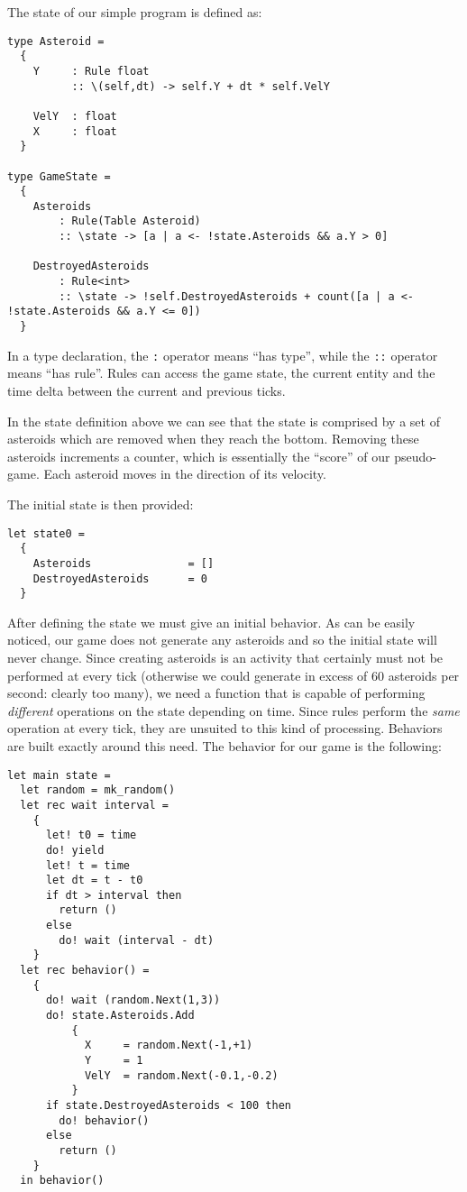 The state of our simple program is defined as:

\begin{lstlisting}
type Asteroid =
  {
    Y     : Rule float
          :: \(self,dt) -> self.Y + dt * self.VelY
        
    VelY  : float        
    X     : float
  }

type GameState =
  {
    Asteroids           
        : Rule(Table Asteroid)
        :: \state -> [a | a <- !state.Asteroids && a.Y > 0]
  	    
    DestroyedAsteroids	
        : Rule<int>
        :: \state -> !self.DestroyedAsteroids + count([a | a <- !state.Asteroids && a.Y <= 0])
  }
\end{lstlisting}
  
In a type declaration, the \texttt{:} operator means ``has type'', while the \texttt{::} operator means ``has rule''. Rules can access the game state, the current entity and the time delta between the current and previous ticks.

In the state definition above we can see that the state is comprised by a set of asteroids which are removed when they reach the bottom. Removing these asteroids increments a counter, which is essentially the ``score'' of our pseudo-game. Each asteroid moves in the direction of its velocity.

The initial state is then provided:
\begin{lstlisting}
let state0 =
  {
    Asteroids               = []
    DestroyedAsteroids      = 0
  }
\end{lstlisting}

After defining the state we must give an initial behavior. As can be easily noticed, our game does not generate any asteroids and so the initial state will never change. Since creating asteroids is an activity that certainly must not be performed at every tick (otherwise we could generate in excess of 60 asteroids per second: clearly too many), we need a function that is capable of performing \textit{different} operations on the state depending on time. Since rules perform the \textit{same} operation at every tick, they are unsuited to this kind of processing. Behaviors are built exactly around this need. The behavior for our game is the following:

\begin{lstlisting}
let main state =
  let random = mk_random()
  let rec wait interval =
    {
      let! t0 = time
      do! yield
      let! t = time
      let dt = t - t0
      if dt > interval then
        return ()
      else
        do! wait (interval - dt)
    }  
  let rec behavior() =
    {
      do! wait (random.Next(1,3))
      do! state.Asteroids.Add
      	  {
      	    X     = random.Next(-1,+1)
      	    Y     = 1
      	    VelY  = random.Next(-0.1,-0.2)
      	  }
      if state.DestroyedAsteroids < 100 then
        do! behavior()
      else
        return ()
    }
  in behavior()
\end{lstlisting}
  
